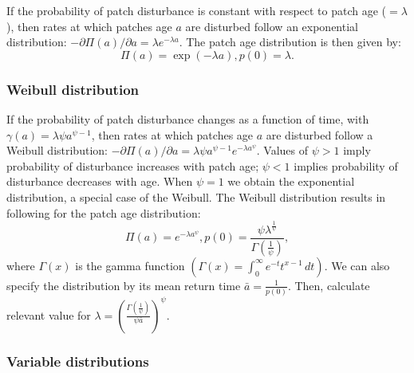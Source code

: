 \documentclass[10pt,twoside]{article}
\begin{document}
If the probability of patch disturbance is constant with respect to
patch age (\(=\lambda\)), then rates at which patches age \(a\) are
disturbed follow an exponential distribution:
\(-\partial \Pi(a)/ \partial a = \lambda e^{-\lambda a}\). The patch age
distribution is then given by:
\[ \Pi(a) = \exp\left(-\lambda a\right), p(0) = \lambda.\]

\subsubsection{Weibull distribution}\label{weibull-distribution}

If the probability of patch disturbance changes as a function of time,
with \(\gamma(a) = \lambda \psi a^{\psi-1}\), then rates at which
patches age \(a\) are disturbed follow a Weibull distribution:
\(-\partial \Pi(a)/ \partial a = \lambda \psi a^{\psi -1}e^{-\lambda a^\psi}\).
Values of \(\psi>1\) imply probability of disturbance increases with
patch age; \(\psi<1\) implies probability of disturbance decreases with
age. When \(\psi=1\) we obtain the exponential distribution, a special
case of the Weibull. The Weibull distribution results in following for
the patch age distribution:
\[\Pi(a) = e^{-\lambda a^\psi}, p(0) =  \frac{\psi \lambda^{\frac1{\psi}}}{\Gamma\left(\frac1{\psi}\right)},\]
where \(\Gamma(x)\) is the gamma function
\(\left(\Gamma(x) = \int_{0}^{\infty}e^{-t}t^{x-1}\, dt\right)\). We can
also specify the distribution by its mean return time
\(\bar{a} = \frac1{p(0)}\). Then, calculate relevant value for
\(\lambda = \left(\frac{\Gamma\left(\frac1{\psi}\right)}{\psi \bar{a}}\right)^{\psi}\).

\subsubsection{Variable distributions}\label{variable-distributions}
\end{document}
